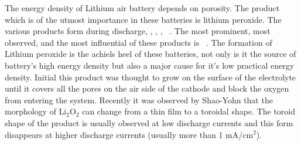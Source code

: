 \documentclass[Notes.tex]{subfiles}
\begin{document}
The energy density of Lithium air battery depends on porosity. The product which is of the utmost importance in these batteries is lithium peroxide. The various products form during discharge, , , , ~\cite{Wang2012,Tan2015}.
The most prominent, most observed, and the most influential of these products is ~\cite{Bardenhagen2015}. The formation of Lithium peroxide is the achiels heel of these batteries, not only is it the source of battery's high energy density but also a major cause for it's low practical energy density. Initial this product was thought to grow on the surface of the electrolyte until it covers all the pores on the air side of the cathode and block the oxygen from entering the system.
Recently it was observed by Shao-Yohn that the morphology of Li$_2$O$_2$ can change from a thin film to a toroidal shape. The toroid shape of the product is usually observed at low discharge currents and this form disappears at higher discharge currents (usually more than 1 mA/cm$^2$).  
\end{document}
